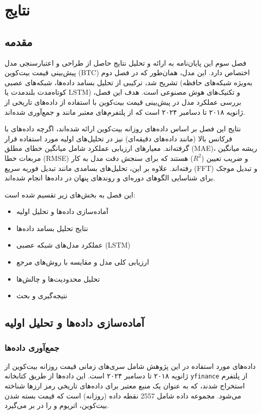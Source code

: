 \chapter{نتایج}
\label{chap:results}

\section{مقدمه}
فصل سوم این پایان‌نامه به ارائه و تحلیل نتایج حاصل از طراحی و اعتبارسنجی مدل پیش‌بینی قیمت بیت‌کوین (BTC) اختصاص دارد. این مدل، همان‌طور که در فصل دوم تشریح شد، ترکیبی از تحلیل بسامد داده‌ها، شبکه‌های عصبی (به‌ویژه شبکه‌های حافظه کوتاه‌مدت بلندمدت یا LSTM) و تکنیک‌های هوش مصنوعی است. هدف این فصل، بررسی عملکرد مدل در پیش‌بینی قیمت بیت‌کوین با استفاده از داده‌های تاریخی از ژانویه ۲۰۱۸ تا دسامبر ۲۰۲۴ است که از پلتفرم‌های معتبر مانند  و  جمع‌آوری شده‌اند. 

نتایج این فصل بر اساس داده‌های روزانه بیت‌کوین ارائه شده‌اند، اگرچه داده‌های با فرکانس بالا (مانند داده‌های دقیقه‌ای) نیز در تحلیل‌های اولیه مورد استفاده قرار گرفته‌اند. معیارهای ارزیابی عملکرد شامل میانگین خطای مطلق (MAE)، ریشه میانگین مربعات خطا (RMSE) و ضریب تعیین (\(R^2\)) هستند که برای سنجش دقت مدل به کار رفته‌اند. علاوه بر این، تحلیل‌های بسامدی مانند تبدیل فوریه سریع (FFT) و تبدیل موجک برای شناسایی الگوهای دوره‌ای و روندهای پنهان در داده‌ها انجام شده‌اند.

این فصل به بخش‌های زیر تقسیم شده است:
\begin{itemize}
	\item آماده‌سازی داده‌ها و تحلیل اولیه
	\item نتایج تحلیل بسامد داده‌ها
	\item عملکرد مدل‌های شبکه عصبی (LSTM)
	\item ارزیابی کلی مدل و مقایسه با روش‌های مرجع
	\item تحلیل محدودیت‌ها و چالش‌ها
	\item نتیجه‌گیری و بحث
\end{itemize}

\section{آماده‌سازی داده‌ها و تحلیل اولیه}
\label{sec:data_preparation}

\subsection{جمع‌آوری داده‌ها}
داده‌های مورد استفاده در این پژوهش شامل سری‌های زمانی قیمت روزانه بیت‌کوین از ژانویه ۲۰۱۸ تا دسامبر ۲۰۲۴ است. این داده‌ها از طریق کتابخانه \texttt{yfinance} از پلتفرم  استخراج شدند، که به عنوان یک منبع معتبر برای داده‌های تاریخی رمز ارزها شناخته می‌شود. مجموعه داده شامل 2557 نقطه داده (روزانه) است که قیمت بسته شدن  بیت‌کوین، اتریوم و  را در بر می‌گیرد. 


